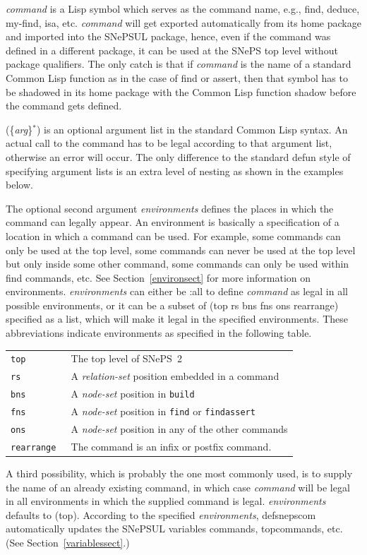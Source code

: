 \documentclass{book}
\newcommand{\ct}[1]{{\ttfamily #1}} %
\begin{document}
{\it command} is a Lisp symbol which serves as the command name, e.g.,
\ct{find}, \ct{deduce}, \ct{my-find}, \ct{isa}, etc. {\it command}
will get exported automatically from its home package and imported
into the SNePSUL package, hence, even if the command was defined in a
different package, it can be used at the SNePS top level without
package qualifiers. The only catch is that if {\it command} is the
name of a standard {\sc Common Lisp} function as in the case of \ct{find} or
\ct{assert}, then that symbol has to be shadowed in its home package with
the {\sc Common Lisp} function \ct{shadow} before the command gets
defined.

\ct{(\{{\it arg}\}$^*$)} is an optional argument list in the standard
{\sc Common Lisp} syntax.  An actual call to the command has to be
legal according to that argument list, otherwise an error will
occur. The only difference to the standard \ct{defun} style of
specifying argument lists is an extra level of nesting as shown in the
examples below.

The optional second argument {\it environments} defines the places in
which the command can legally appear. An environment is basically a
specification of a location in which a command can be used. For
example, some commands can only be used at the top level, some
commands can never be used at the top level but only inside some other
command, some commands can only be used within \ct{find} commands,
etc. See Section~\ref{environsect} for more information on
environments.  {\it environments} can either be \ct{:all} to define
{\it command} as legal in all possible environments, or it can be a
subset of \ct{(top rs bns fns ons rearrange)} specified as a
list, which will make it legal in the specified environments.  These
abbreviations indicate environments as specified in the following
table.
\begin{center}
\begin{tabular}{ll}
\tt top & The top level of SNePS~2\\
\tt rs & A {\em relation-set} position embedded in a command\\
\tt bns & A {\em node-set} position in {\tt build}\\
\tt fns & A {\em node-set} position in {\tt find} or {\tt findassert}\\
\tt ons & A {\em node-set} position in any of the other commands\\
\tt rearrange & The command is an infix or postfix command.
\end{tabular}
\end{center}
A third possibility, which is probably
the one most commonly used, is to supply the name of an already
existing command, in which case {\it command} will be legal in all
environments in which the supplied command is legal. {\it
environments} defaults to \ct{(top)}. According to the specified {\it
environments}, \ct{defsnepscom} automatically updates the SNePSUL
variables \ct{commands}, \ct{topcommands}, etc. (See
Section~\ref{variablessect}.)
\end{document}
